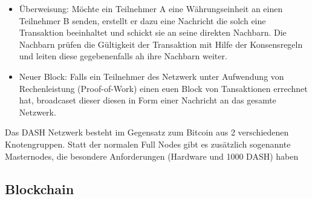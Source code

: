 \begin{itemize}
\item Überweisung: Möchte ein Teilnehmer A eine Währungseinheit an einen Teilnehmer B senden, erstellt er dazu eine Nachricht die solch eine Transaktion beeinhaltet und schickt sie an seine direkten Nachbarn. Die Nachbarn prüfen die Gültigkeit der Transaktion mit Hilfe der Konsensregeln und leiten diese gegebenenfalls ah ihre Nachbarn weiter.
\item Neuer Block: Falls ein Teilnehmer des Netzwerk unter Aufwendung von Rechenleistung (Proof-of-Work) einen euen Block von Tansaktionen errechnet hat, broadcaset dieser diesen in Form einer Nachricht an das gesamte Netzwerk.
\end{itemize}

Das DASH Netzwerk besteht im Gegensatz zum Bitcoin aus 2 verschiedenen Knotengruppen. Statt der normalen Full Nodes gibt es zusätzlich sogenannte Masternodes, die besondere Anforderungen (Hardware und 1000 DASH) haben 



\subsection{Blockchain}

